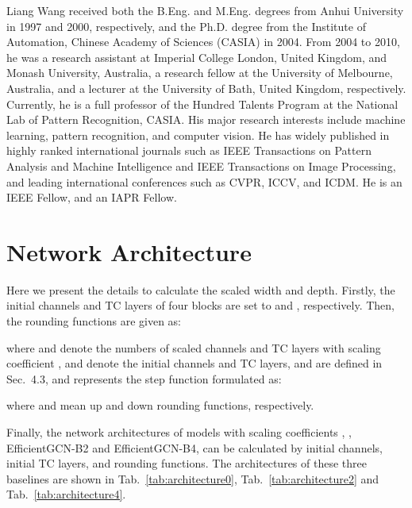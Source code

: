 \documentclass[10pt,journal,compsoc]{IEEEtran}
\begin{document}
\begin{IEEEbiography}{Liang Wang}
received both the B.Eng. and M.Eng. degrees from Anhui University in 1997 and 2000, respectively, and the Ph.D. degree from the Institute of Automation, Chinese Academy of Sciences (CASIA) in 2004. From 2004 to 2010, he was a research assistant at Imperial College London, United Kingdom, and Monash University, Australia, a research fellow at the University of Melbourne, Australia, and a lecturer at the University of Bath, United Kingdom, respectively. Currently, he is a full professor of the Hundred Talents Program at the National Lab of Pattern Recognition, CASIA. His major research interests include machine learning, pattern recognition, and computer vision. He has widely published in highly ranked international journals such as IEEE Transactions on Pattern Analysis and Machine Intelligence and IEEE Transactions on Image Processing, and leading international conferences such as CVPR, ICCV, and ICDM. He is an IEEE Fellow, and an IAPR Fellow.
\end{IEEEbiography}

\newpage
\appendices
\setcounter{page}{1}
\setcounter{equation}{0}
\renewcommand\theequation{S.\arabic{equation}}
\setcounter{table}{0}
\renewcommand\thetable{S.\arabic{table}}
\setcounter{figure}{0}
\renewcommand\thefigure{S.\arabic{figure}}

\section{Network Architecture}
\label{asec:architectures}

Here we present the details to calculate the scaled width and depth. Firstly, the initial channels and TC layers of four blocks are set to  and , respectively. Then, the rounding functions are given as:


where  and  denote the numbers of scaled channels and TC layers with scaling coefficient ,  and  denote the initial channels and TC layers,  and  are defined in Sec.~4.3, and  represents the step function formulated as:

where  and  mean up and down rounding functions, respectively.

Finally, the network architectures of models with scaling coefficients , \ie, EfficientGCN-B2 and EfficientGCN-B4, can be calculated by initial channels, initial TC layers, and rounding functions. The architectures of these three baselines are shown in Tab.~\ref{tab:architecture0}, Tab.~\ref{tab:architecture2} and Tab.~\ref{tab:architecture4}.
\end{document}
